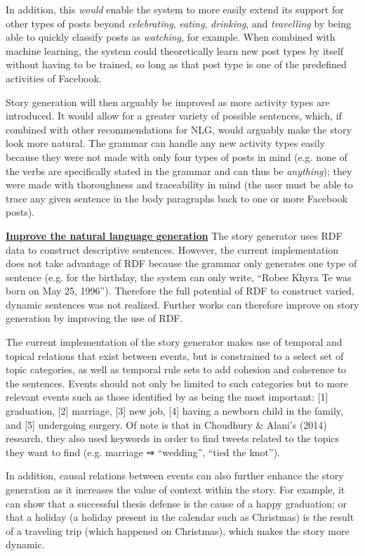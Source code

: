 In addition, this \textit{would} enable the system to more easily extend its support for other types of posts beyond \textit{celebrating}, \textit{eating}, \textit{drinking}, and \textit{travelling} by being able to quickly classify posts as \textit{watching}, for example. When combined with machine learning, the system could theoretically learn new post types by itself without having to be trained, so long as that post type is one of the predefined activities of Facebook.

Story generation will then arguably be improved as more activity types are introduced. It would allow for a greater variety of possible sentences, which, if combined with other recommendations for NLG, would arguably make the story look more natural. The grammar can handle any new activity types easily because they were not made with only four types of posts in mind (e.g. none of the verbs are specifically stated in the grammar and can thus be \textit{anything}); they were made with thoroughness and traceability in mind (the user must be able to trace any given sentence in the body paragraphs back to one or more Facebook posts).

\underline{\textbf{Improve the natural language generation}} \newline
The story generator uses RDF data to construct descriptive sentences. However, the current implementation does not take advantage of RDF because the grammar only generates one type of sentence (e.g. for the birthday, the system can only write, ``Robee Khyra Te was born on May 25, 1996”). Therefore the full potential of RDF to construct varied, dynamic sentences was not realized. Further works can therefore improve on story generation by improving the use of RDF.

The current implementation of the story generator makes use of temporal and topical relations that exist between events, but is constrained to a select set of topic categories, as well as temporal rule sets to add cohesion and coherence to the sentences. Events should not only be limited to such categories but to more relevant events such as those identified by \cite{conf/ht/ChoudhuryA14} as being the most important: [1] graduation, [2] marriage, [3] new job, [4] having a newborn child in the family, and [5] undergoing surgery. Of note is that in Choudhury \& Alani's (2014) research, they also used keywords in order to find tweets related to the topics they want to find (e.g. marriage ⇒ ``wedding”, ``tied the knot”).

In addition, causal relations between events can also further enhance the story generation as it increases the value of context within the story. For example, it can show that a successful thesis defense is the cause of a happy graduation; or that a holiday (a holiday present in the calendar such as Christmas) is the result of a traveling trip (which happened on Christmas), which makes the story more dynamic.

